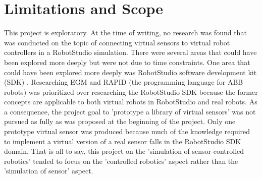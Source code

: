 \documentclass{cslthse-msc}
\begin{document}
\section{Limitations and Scope}
\label{sec:Intro:Limits_Scope}
This project is exploratory. At the time of writing, no research was found that was conducted on the topic of connecting virtual sensors to virtual robot controllers in a RobotStudio simulation. There were several areas that could have been explored more deeply but were not due to time constraints. One area that could have been explored more deeply was RobotStudio software development kit (SDK) \cite{ABB:RS_SDK}. Researching EGM and RAPID (the programming language for ABB robots) was prioritized over researching the RobotStudio SDK because the former concepts are applicable to both virtual robots in RobotStudio and real robots. As a consequence, the project goal to 'prototype a library of virtual sensors' was not pursued as fully as was proposed at the beginning of the project. Only one prototype virtual sensor was produced because much of the knowledge required to implement a virtual version of a real sensor falls in the RobotStudio SDK domain. That is all to say, this project on the 'simulation of sensor-controlled robotics' tended to focus on the 'controlled robotics' aspect rather than the 'simulation of sensor' aspect. 



%
\end{document}
